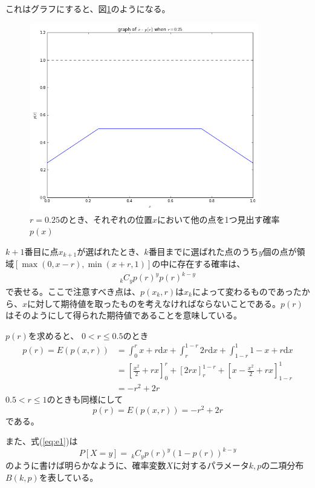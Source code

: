 これはグラフにすると、図\ref{fig:f3}のようになる。
\begin{figure}[H]
    \begin{center}
        \includegraphics[width=10cm]{../img/fig3.png}
        \caption{$r=0.25$のとき、それぞれの位置$x$において他の点を1つ見出す確率$p(x)$}
        \label{fig:f3}
    \end{center}
\end{figure}

$k+1$番目に点$x_{k+1}$が選ばれたとき、$k$番目までに選ばれた点のうち$y$個の点が領域$[\max(0,x-r), \min(x+r,1)]$の中に存在する確率は、
\begin{eqnarray}
_{k}C_{y}p(r)^{y}p(r)^{k-y}
\label{eq:e1}
\end{eqnarray}
で表せる。ここで注意すべき点は、$p(x_{k}, r)$は$x_{k}$によって変わるものであったから、$x$に対して期待値を取ったものを考えなければならないことである。$p(r)$はそのようにして得られた期待値であることを意味している。

$p(r)$を求めると、
$0<r\le0.5$のとき
\begin{align}p(r) = E(p(x, r)) &= \int^{r}_{0}x+r\mathrm{d}x + \int^{1-r}_{r}2r \mathrm{d}x + \int^{1}_{1-r} 1-x+r \mathrm{d}x\nonumber \\
&= \left[\frac{x^{2}}{2} + rx \right]^{r}_{0} + \left[ 2rx\right]^{1-r}_{r}+ \left[ x-\frac{x^{2}}{2} + rx\right]^{1}_{1-r}\nonumber \\
&= -r^{2} + 2r \end{align}
$0.5<r\le1$のときも同様にして
$$p(r) = E(p(x,r)) = -r^{2} + 2r$$
である。

また、式(\ref{eq:e1})は
$$P[X=y] =\ _{k}C_{y}p(r)^{y}(1-p(r))^{k-y}$$
のように書けば明らかなように、確率変数$X$に対するパラメータ$k,p$の二項分布$B(k,p)$を表している。

